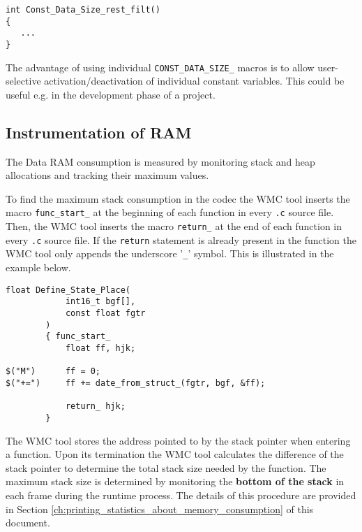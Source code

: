 \begin{Verbatim}[fontsize=\small]
int Const_Data_Size_rest_filt()
{
   ...
}
\end{Verbatim}

The advantage of using individual \verb|CONST_DATA_SIZE_| macros is to allow user-selective activation/deactivation of individual constant variables. This could be useful e.g. in the development phase of a project.

\subsection{Instrumentation of RAM}
\label{ch:instrumentation_of_RAM}

The Data RAM consumption is measured by monitoring stack and heap allocations and tracking their maximum values.

To find the maximum stack consumption in the codec the WMC tool inserts the macro \verb|func_start_| at the beginning of each function in every \verb|.c| source file. Then, the WMC tool inserts the macro \verb|return_| at the end of each function in every \verb|.c| source file. If the \verb|return| statement is already present in the function the WMC tool only appends the underscore '\verb|_|' symbol. This is illustrated in the example below.

\begin{Verbatim}[fontsize=\small]
        float Define_State_Place(
            int16_t bgf[],
            const float fgtr
        )
        { func_start_
            float ff, hjk;

$("M")      ff = 0;
$("+=")     ff += date_from_struct_(fgtr, bgf, &ff);

            return_ hjk;
        }
\end{Verbatim}

The WMC tool stores the address pointed to by the stack pointer when entering a function. Upon its termination the WMC tool calculates the difference of the stack pointer to determine the total stack size needed by the function. The maximum stack size is determined by monitoring the \textbf{bottom of the stack} in each frame during the runtime process. The details of this procedure are provided in Section \ref{ch:printing_statistics_about_memory_consumption} of this document.

